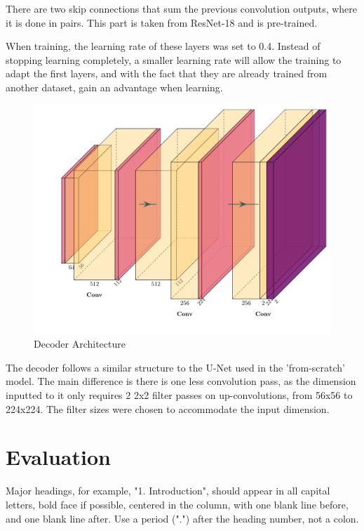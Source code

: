\documentclass{article}
\begin{document}
There are two skip connections that sum the previous convolution outputs, where it is done in pairs. This part is taken from ResNet-18 and is pre-trained.

When training, the learning rate of these layers was set to 0.4. Instead of stopping learning completely, a smaller learning rate will allow the training to adapt the first layers, and with the fact that they are already trained from another dataset, gain an advantage when learning.

\begin{figure}[H]
    \centering
    \includegraphics[width=\linewidth]{resnetUnetDecode.pdf}
    \caption{Decoder Architecture}
\end{figure} 

The decoder follows a similar structure to the U-Net used in the 'from-scratch' model. The main difference is there is one less convolution pass, as the dimension inputted to it only requires 2 2x2 filter passes on up-convolutions, from 56x56 to 224x224. The filter sizes were chosen to accommodate the input dimension.

\section{Evaluation}
\label{sec:majhead}

Major headings, for example, "1. Introduction", should appear in all capital
letters, bold face if possible, centered in the column, with one blank line
before, and one blank line after. Use a period (".") after the heading number,
not a colon.
\end{document}
